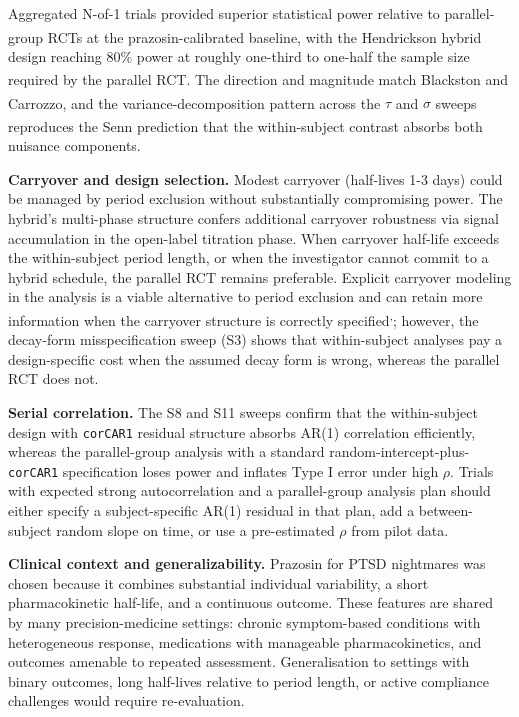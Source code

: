 \documentclass[
  11pt,
]{article}
\begin{document}
Aggregated N-of-1 trials provided superior statistical power
relative to parallel-group RCTs at the prazosin-calibrated
baseline, with the Hendrickson\textsuperscript{}
hybrid design reaching 80\% power at roughly one-third to
one-half the sample size required by the parallel RCT. The
direction and magnitude match Blackston\textsuperscript{} and Carrozzo\textsuperscript{}, and the variance-decomposition pattern
across the \(\tau\) and \(\sigma\) sweeps reproduces the Senn\textsuperscript{} prediction that the
within-subject contrast absorbs both nuisance components.

\textbf{Carryover and design selection.} Modest carryover (half-lives
1-3 days) could be managed by period exclusion without
substantially compromising power. The hybrid's multi-phase
structure confers additional carryover robustness via signal
accumulation in the open-label titration phase. When carryover
half-life exceeds the within-subject period length, or when the
investigator cannot commit to a hybrid schedule, the parallel
RCT remains preferable. Explicit carryover modeling in the
analysis is a viable alternative to period exclusion and can
retain more information when the carryover structure is
correctly specified\textsuperscript{,};
however, the decay-form misspecification sweep (S3) shows that
within-subject analyses pay a design-specific cost when the
assumed decay form is wrong, whereas the parallel RCT does not.

\textbf{Serial correlation.} The S8 and S11 sweeps confirm that the
within-subject design with \texttt{corCAR1} residual structure absorbs
AR(1) correlation efficiently, whereas the parallel-group
analysis with a standard random-intercept-plus-\texttt{corCAR1}
specification loses power and inflates Type I error under high
\(\rho\). Trials with expected strong autocorrelation and a
parallel-group analysis plan should either specify a
subject-specific AR(1) residual in that plan, add a between-subject random
slope on time, or use a pre-estimated \(\rho\) from pilot data.

\textbf{Clinical context and generalizability.} Prazosin for PTSD
nightmares was chosen because it combines substantial individual
variability, a short pharmacokinetic half-life, and a continuous
outcome. These features are shared by many precision-medicine
settings: chronic symptom-based conditions with heterogeneous
response, medications with manageable pharmacokinetics, and
outcomes amenable to repeated assessment. Generalisation to
settings with binary outcomes, long half-lives relative to
period length, or active compliance challenges would require
re-evaluation.
\end{document}
